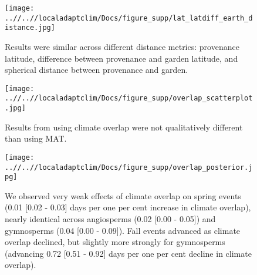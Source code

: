 \documentclass{article}
\begin{document}
\begin{figure}[!h] 
    \centering
 \texttt{[image: ..//..//localadaptclim/Docs/figure\_supp/lat\_latdiff\_earth\_distance.jpg]}
    \caption{Results were similar across different distance metrics: provenance latitude, difference between provenance and garden latitude, and spherical distance between provenance and garden.}
    \label{figure:lat_distance}
\end{figure}


\begin{figure}[!h] 
    \centering
 \texttt{[image: ..//..//localadaptclim/Docs/figure\_supp/overlap\_scatterplot.jpg]}
    \caption{Results from using climate overlap were not qualitatively different than using MAT.}
    \label{figure:overlap_scatterplot}
\end{figure}


\begin{figure}[!h] 
    \centering
 \texttt{[image: ..//..//localadaptclim/Docs/figure\_supp/overlap\_posterior.jpg]}
    \caption{We observed very weak effects of climate overlap on spring events (0.01 [0.02 - 0.03] days per one per cent increase in climate overlap), nearly identical across angiosperms (0.02 [0.00 - 0.05]) and gymnosperms (0.04 [0.00 - 0.09]). Fall events advanced as climate overlap declined, but slightly more strongly for gymnosperms
(advancing 0.72 [0.51 - 0.92] days per one per cent decline in climate overlap).}
    \label{figure:overlap_posterior}
\end{figure}




% 
% 
% 
% 
% 
 
\end{document}

